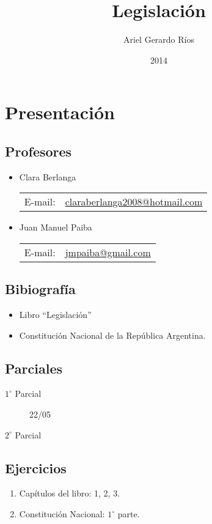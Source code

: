 \documentclass[a4paper]{report}
\begin{document}
    \title{Legislación}
    \author{Ariel Gerardo Ríos}
    \date{2014}
    \maketitle

    \tableofcontents

    \chapter{Presentación}

        \section{Profesores}

            \begin{itemize}
                \item Clara Berlanga
                    \begin{tabular}{l@{\thinspace}l}
                        E-mail:     &\href{mailto:claraberlanga2008@hotmail.com}{claraberlanga2008@hotmail.com}
                    \end{tabular}

                \item Juan Manuel Paiba
                    \begin{tabular}{l@{\thinspace}l}
                        E-mail:     &\href{mailto:jmpaiba@gmail.com}{jmpaiba@gmail.com}
                    \end{tabular}
            \end{itemize}

        \section{Bibiografía}

            \begin{itemize}
                \item Libro ``Legislación''
                \item Constitución Nacional de la República Argentina.
            \end{itemize}

        \section{Parciales}

            \begin{description}
                \item[$1^{\circ}$ Parcial] 22/05
                \item[$2^{\circ}$ Parcial]
            \end{description}

        \section{Ejercicios}

            \begin{enumerate}
                \item Capítulos del libro: 1, 2, 3.
                \item Constitución Nacional: $1^{\circ}$ parte.
            \end{enumerate}
\end{document}
